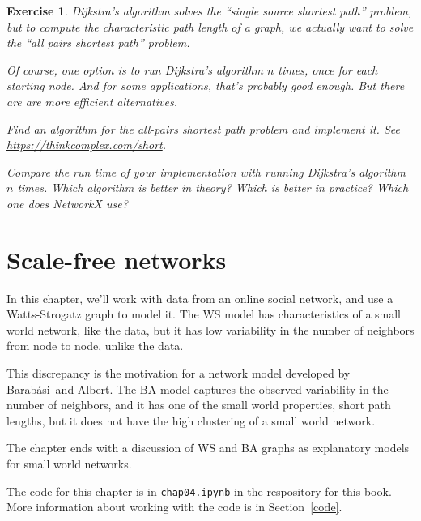 \documentclass[12pt]{book}
\theoremstyle{exercise}
\newtheorem{exercise}{Exercise}[chapter]
\begin{document}
\begin{exercise}

Dijkstra's algorithm solves the ``single source shortest path''
problem, but to compute the characteristic path length of a graph,
we actually want to solve the ``all pairs shortest path'' problem.


Of course, one option is to run Dijkstra's algorithm $n$ times,
once for each starting node.  And for some applications, that's
probably good enough.  But there are are more efficient alternatives.

Find an algorithm for the all-pairs shortest path problem and
implement it.  See
\url{https://thinkcomplex.com/short}.

Compare the run time of your implementation with running
Dijkstra's algorithm $n$ times.  Which algorithm is better in
theory?  Which is better in practice?  Which one does NetworkX
use?


\end{exercise}



\chapter{Scale-free networks}
\label{scale-free}

\newcommand{\Barabasi}{Barab\'{a}si}

In this chapter, we'll work with data from an online social network, and use a
Watts-Strogatz graph to model it.  The WS model has characteristics of
a small world network, like the data, but it has low
variability in the number of neighbors from node to node,
unlike the data.

This discrepancy is the motivation for a network model developed
by \Barabasi~and Albert.  The BA model captures the observed variability
in the number of neighbors, and it has one of the small world
properties, short path lengths, but it does not have the high
clustering of a small world network.

The chapter ends with a discussion of WS and BA graphs as explanatory
models for small world networks.

The code for this chapter is in {\tt chap04.ipynb} in the respository
for this book.  More information about working with the code is
in Section~\ref{code}.
\end{document}
